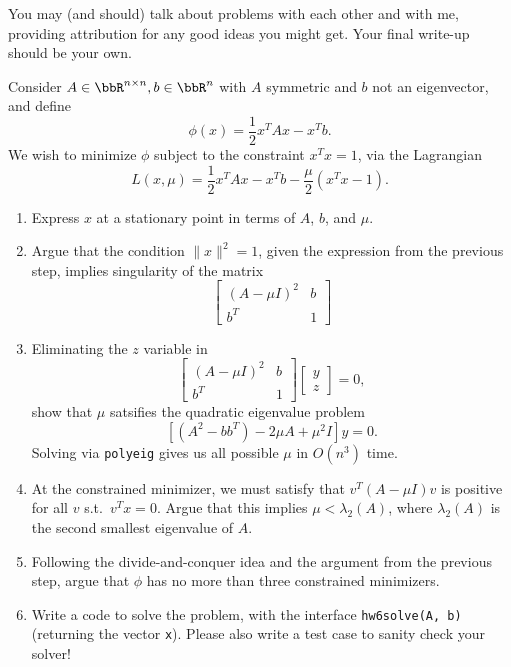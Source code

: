 \documentclass[12pt, leqno]{article} %
\begin{document}

You may (and should) talk about problems with each other and with me,
providing attribution for any good ideas you might get.  Your final
write-up should be your own.

Consider $A \in \bbR^{n \times n}, b \in \bbR^n$ with $A$ symmetric
and $b$ not an eigenvector, and define
\[
  \phi(x) = \frac{1}{2} x^T A x - x^T b.
\]
We wish to minimize $\phi$ subject to the constraint $x^T x = 1$,
via the Lagrangian
\[
  L(x,\mu) = \frac{1}{2} x^T A x - x^T b - \frac{\mu}{2} (x^T x - 1).
\]
\begin{enumerate}
\item Express $x$ at a stationary point in terms
  of $A$, $b$, and $\mu$.
\item Argue that the condition $\|x\|^2 = 1$, given the expression
  from the previous step, implies
  singularity of the matrix
  \[
    \begin{bmatrix} (A-\mu I)^2 & b \\ b^T & 1 \end{bmatrix}
  \]
\item
  Eliminating the $z$ variable in
  \[
    \begin{bmatrix}
      (A-\mu I)^2 & b \\
      b^T & 1
    \end{bmatrix}
    \begin{bmatrix} y \\ z \end{bmatrix} = 0,
  \]
  show that $\mu$ satsifies the quadratic eigenvalue problem
  \[
    \left[ (A^2-bb^T) - 2 \mu A + \mu^2 I \right] y = 0.
  \]
  Solving via {\tt polyeig} gives
  us all possible $\mu$ in $O(n^3)$ time.
\item
  At the constrained minimizer, we must satisfy that
  $v^T (A-\mu I) v$ is positive for all $v$ s.t.~$v^T x = 0$.
  Argue that this implies $\mu < \lambda_2(A)$, where $\lambda_2(A)$
  is the second smallest eigenvalue of $A$.
\item
  Following the divide-and-conquer idea and the argument
  from the previous step, argue that $\phi$
  has no more than three constrained minimizers.
\item
  Write a code to solve the problem, with the interface
  {\tt hw6solve(A, b)} (returning the vector {\tt x}).
  Please also write a test case to sanity check your solver!
\end{enumerate}
\end{document}

